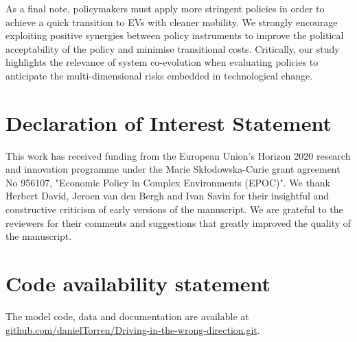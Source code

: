 \documentclass[12pt]{article}
\begin{document}
	
	As a final note, policymakers must apply more stringent policies in order to achieve a quick transition to EVs with cleaner mobility. We strongly encourage exploiting positive synergies between policy instruments to improve the political acceptability of the policy and minimise transitional costs. Critically, our study highlights the relevance of system co-evolution when evaluating policies to anticipate the multi-dimensional risks embedded in technological change.  %
	

	\section*{Declaration of Interest Statement}
	This work has received funding from the European Union’s Horizon 2020 research and innovation programme under the Marie Skłodowska-Curie grant agreement No 956107, "Economic Policy in Complex Environments (EPOC)". We thank Herbert David, Jeroen van den Bergh and Ivan Savin for their insightful and constructive criticism of early versions of the manuscript. We are grateful to the reviewers for their comments and suggestions that greatly improved the quality of the manuscript.
	
	\section*{Code availability statement}
	The model code, data and documentation are available at \href{https://github.com/danielTorren/Driving-in-the-wrong-direction.git}{github.com/danielTorren/Driving-in-the-wrong-direction.git}.
\end{document}
